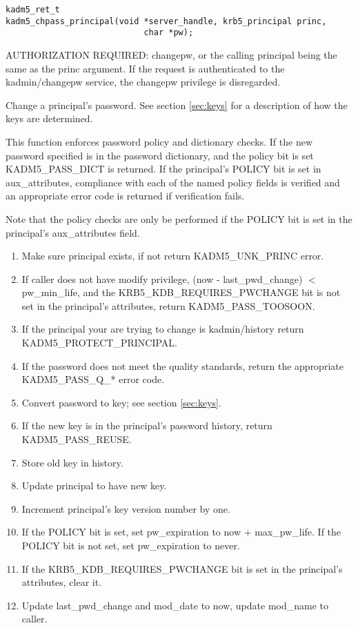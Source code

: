 \begin{verbatim}
kadm5_ret_t
kadm5_chpass_principal(void *server_handle, krb5_principal princ,
                            char *pw);
\end{verbatim}

AUTHORIZATION REQUIRED: changepw, or the calling principal being the
same as the princ argument.  If the request is authenticated to the
kadmin/changepw service, the changepw privilege is disregarded.

Change a principal's password.   See section \ref{sec:keys} for a
description of how the keys are determined.

This function enforces password policy and dictionary checks.  If the new
password specified is in the password dictionary, and the policy bit is set
KADM5_PASS_DICT is returned.  If the principal's POLICY bit is set in
aux_attributes, compliance with each of the named policy fields is verified
and an appropriate error code is returned if verification fails.

Note that the policy checks are only be performed if the POLICY bit is
set in the principal's aux_attributes field.

\begin{enumerate}
\item Make sure principal exists, if not return KADM5_UNK_PRINC error.
\item If caller does not have modify privilege, (now - last_pwd_change) $<$
pw_min_life, and the KRB5_KDB_REQUIRES_PWCHANGE bit is not set in the
principal's attributes, return KADM5_PASS_TOOSOON.
\item If the principal your are trying to change is kadmin/history
return KADM5_PROTECT_PRINCIPAL.
\item If the password does not meet the quality
standards, return the appropriate KADM5_PASS_Q_* error code.
\item Convert password to key; see section \ref{sec:keys}.
\item If the new key is in the principal's password history, return
KADM5_PASS_REUSE.
\item Store old key in history.
\item Update principal to have new key.
\item Increment principal's key version number by one.
\item If the POLICY bit is set, set pw_expiration to now +
max_pw_life.  If the POLICY bit is not set, set pw_expiration to
never.
\item If the KRB5_KDB_REQUIRES_PWCHANGE bit is set in the principal's
attributes, clear it.
\item Update last_pwd_change and mod_date to now, update mod_name to
caller.
\end{enumerate}

